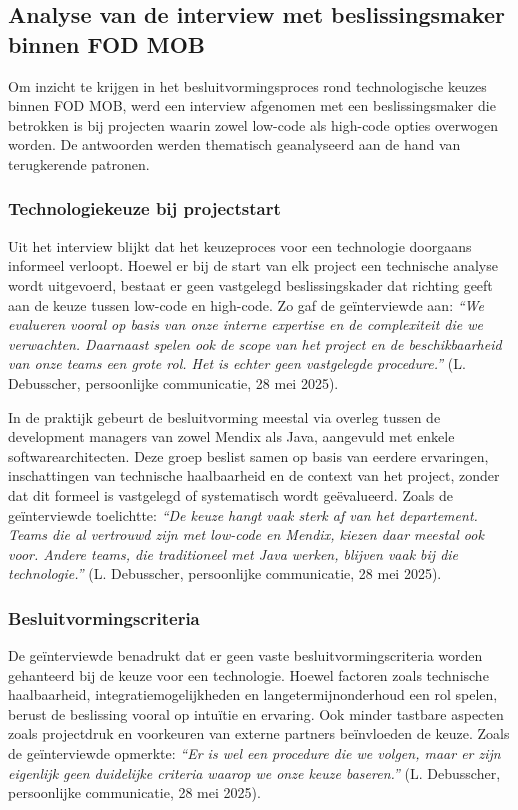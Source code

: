 \subsection{Analyse van de interview met beslissingsmaker binnen \gls{FOD MOB}}

Om inzicht te krijgen in het besluitvormingsproces rond technologische keuzes binnen \gls{FOD MOB}, werd een interview afgenomen met een beslissingsmaker die betrokken is bij projecten waarin zowel low-code als high-code opties overwogen worden. De antwoorden werden thematisch geanalyseerd aan de hand van terugkerende patronen.

\subsubsection{Technologiekeuze bij projectstart}

Uit het interview blijkt dat het keuzeproces voor een technologie doorgaans informeel verloopt. Hoewel er bij de start van elk project een technische analyse wordt uitgevoerd, bestaat er geen vastgelegd beslissingskader dat richting geeft aan de keuze tussen low-code en high-code. Zo gaf de geïnterviewde aan: \textit{“We evalueren vooral op basis van onze interne expertise en de complexiteit die we verwachten. Daarnaast spelen ook de scope van het project en de beschikbaarheid van onze teams een grote rol. Het is echter geen vastgelegde procedure.”} (L. Debusscher, persoonlijke communicatie, 28 mei 2025).

In de praktijk gebeurt de besluitvorming meestal via overleg tussen de development managers van zowel Mendix als Java, aangevuld met enkele softwarearchitecten. Deze groep beslist samen op basis van eerdere ervaringen, inschattingen van technische haalbaarheid en de context van het project, zonder dat dit formeel is vastgelegd of systematisch wordt geëvalueerd. Zoals de geïnterviewde toelichtte: \textit{“De keuze hangt vaak sterk af van het departement. Teams die al vertrouwd zijn met low-code en Mendix, kiezen daar meestal ook voor. Andere teams, die traditioneel met Java werken, blijven vaak bij die technologie.”} (L. Debusscher, persoonlijke communicatie, 28 mei 2025).

\subsubsection{Besluitvormingscriteria}

De geïnterviewde benadrukt dat er geen vaste besluitvormingscriteria worden gehanteerd bij de keuze voor een technologie. Hoewel factoren zoals technische haalbaarheid, integratiemogelijkheden en langetermijnonderhoud een rol spelen, berust de beslissing vooral op intuïtie en ervaring. Ook minder tastbare aspecten zoals projectdruk en voorkeuren van externe partners beïnvloeden de keuze. Zoals de geïnterviewde opmerkte: \textit{“Er is wel een procedure die we volgen, maar er zijn eigenlijk geen duidelijke criteria waarop we onze keuze baseren.”} (L. Debusscher, persoonlijke communicatie, 28 mei 2025).

